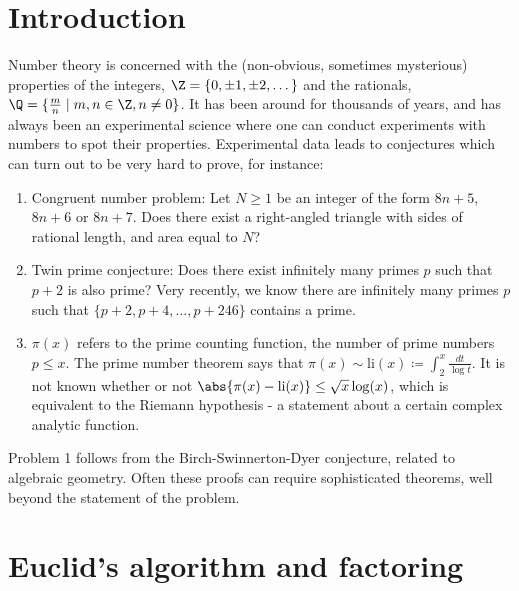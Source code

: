 \documentclass{article}
\begin{document}
\maketitle
\tableofcontents

\clearpage

\section{Introduction}
Number theory is concerned with the (non-obvious, sometimes mysterious) properties of the integers, $\Z = \{0, \pm 1, \pm 2, \dots\}$ and the rationals, $\Q = \{\frac{m}{n} \mid m, n \in \Z, n \ne 0\}$.
It has been around for thousands of years, and has always been an experimental science where one can conduct experiments with numbers to spot their properties. Experimental data leads to conjectures which can turn out to be very hard to prove, for instance:
\begin{enumerate}
    \item Congruent number problem: Let $N \geq 1$ be an integer of the form $8n + 5$, $8n+6$ or $8n + 7$.
        Does there exist a right-angled triangle with sides of rational length, and area equal to $N$?
    \item Twin prime conjecture: Does there exist infinitely many primes $p$ such that $p+2$ is also prime?
        Very recently, we know there are infinitely many primes $p$ such that $\{p+2, p+4, \dots, p+246\}$ contains a prime.
    \item $\pi(x)$ refers to the prime counting function, the number of prime numbers $p \leq x$.
        The prime number theorem says that $\pi(x) \sim \mathrm{li}(x) \coloneqq \int_2^x \frac{dt}{\log t}$.
        It is not known whether or not $\abs{\pi(x) - \mathrm{li}(x)} \leq \sqrt{x} \log(x)$, which is equivalent to the Riemann hypothesis - a statement about a certain complex analytic function.
\end{enumerate}
Problem 1 follows from the Birch-Swinnerton-Dyer conjecture, related to algebraic geometry.
Often these proofs can require sophisticated theorems, well beyond the statement of the problem.
\clearpage

\section{Euclid's algorithm and factoring}
\end{document}
